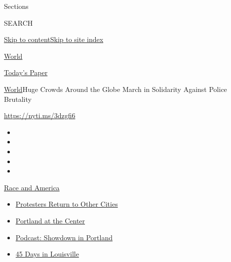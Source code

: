 Sections

SEARCH

\protect\hyperlink{site-content}{Skip to
content}\protect\hyperlink{site-index}{Skip to site index}

\href{https://www.nytimes.com/section/world}{World}

\href{https://myaccount.nytimes.com/auth/login?response_type=cookie\&client_id=vi}{}

\href{https://www.nytimes.com/section/todayspaper}{Today's Paper}

\href{/section/world}{World}\textbar{}Huge Crowds Around the Globe March
in Solidarity Against Police Brutality

\url{https://nyti.ms/3dzgfi6}

\begin{itemize}
\item
\item
\item
\item
\item
\end{itemize}

\href{https://www.nytimes.com/news-event/george-floyd-protests-minneapolis-new-york-los-angeles?action=click\&pgtype=Article\&state=default\&region=TOP_BANNER\&context=storylines_menu}{Race
and America}

\begin{itemize}
\tightlist
\item
  \href{https://www.nytimes.com/2020/07/26/us/protests-portland-seattle-trump.html?action=click\&pgtype=Article\&state=default\&region=TOP_BANNER\&context=storylines_menu}{Protesters
  Return to Other Cities}
\item
  \href{https://www.nytimes.com/2020/07/24/us/portland-oregon-protests-white-race.html?action=click\&pgtype=Article\&state=default\&region=TOP_BANNER\&context=storylines_menu}{Portland
  at the Center}
\item
  \href{https://www.nytimes.com/2020/07/23/podcasts/the-daily/portland-protests.html?action=click\&pgtype=Article\&state=default\&region=TOP_BANNER\&context=storylines_menu}{Podcast:
  Showdown in Portland}
\item
  \href{https://www.nytimes.com/interactive/2020/07/16/us/black-lives-matter-protests-louisville-breonna-taylor.html?action=click\&pgtype=Article\&state=default\&region=TOP_BANNER\&context=storylines_menu}{45
  Days in Louisville}
\end{itemize}

